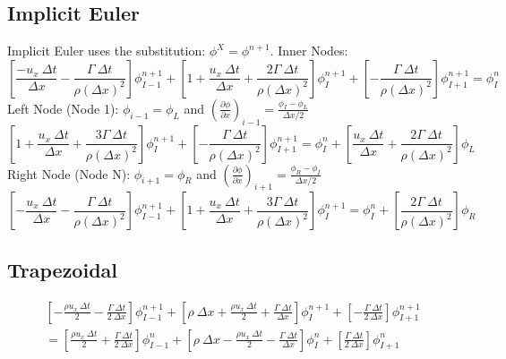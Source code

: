 \documentclass[12pt]{article}
\begin{document}
\subsection{Implicit Euler}
Implicit Euler uses the substitution: $\phi^{X} = \phi^{n+1}$.
Inner Nodes:
\begin{equation}
    \left[ \frac{-u_x\: \Delta t}{\Delta x} - \frac{\Gamma\:\Delta t}{\rho\left(\Delta x\right)^2} \right]\phi_{I-1}^{n+1} + \left[ 1 + \frac{u_x\: \Delta t}{\Delta x} + \frac{2\Gamma\: \Delta t}{\rho\left(\Delta x\right)^2} \right]\phi_{I}^{n+1} + \left[ -\frac{\Gamma\: \Delta t}{\rho\left(\Delta x\right)^2} \right]\phi_{I+1}^{n+1} = \phi_{I}^{n}
    \label{eq:ie inner}
\end{equation}
Left Node (Node 1): $\phi_{i-1} = \phi_L$ and $\left( \frac{\partial \phi}{\partial x} \right)_{i-1} = \frac{\phi_I - \phi_L}{\Delta x/2}$
\begin{equation}
    \left[ 1 + \frac{u_x\:\Delta t}{\Delta x} + \frac{3\Gamma\:\Delta t}{\rho\left(\Delta x\right)^2} \right]\phi_{I}^{n+1} + \left[ -\frac{\Gamma\:\Delta t}{\rho\left(\Delta x\right)^2} \right]\phi_{I+1}^{n+1} = \phi_{I}^{n} + \left[ \frac{u_x\:\Delta t}{\Delta x} + \frac{2\Gamma\:\Delta t}{\rho\left(\Delta x\right)^2} \right]\phi_{L}
    \label{eq:ie left}
\end{equation}
Right Node (Node N): $\phi_{i+1} = \phi_R$ and $\left( \frac{\partial \phi}{\partial x} \right)_{i+1} = \frac{\phi_R - \phi_I}{\Delta x/2}$
\begin{equation}
    \left[ -\frac{u_x\:\Delta t}{\Delta x} - \frac{\Gamma\:\Delta t}{\rho\left(\Delta x\right)^2} \right]\phi_{I-1}^{n+1} + \left[ 1 + \frac{u_x\:\Delta t}{\Delta x} + \frac{3\Gamma\:\Delta t}{\rho\left(\Delta x\right)^2} \right]\phi_{I}^{n+1} = \phi_{I}^{n} + \left[ \frac{2\Gamma\:\Delta t}{\rho\left(\Delta x\right)^2} \right]\phi_{R}
    \label{eq:ie right}
\end{equation}


\subsection{Trapezoidal}
\begin{multline*}
    \left[ -\frac{\rho u_x\: \Delta t}{2} - \frac{\Gamma\: \Delta t}{2\: \Delta x} \right]\phi_{I-1}^{n+1} + \left[ \rho \:\Delta x + \frac{\rho u_x\: \Delta t}{2} + \frac{\Gamma\: \Delta t}{\Delta x} \right]\phi_{I}^{n+1} + \left[ -\frac{\Gamma\: \Delta t}{2\: \Delta x} \right]\phi_{I+1}^{n+1}\\
    = \left[ \frac{\rho u_x\: \Delta t}{2} + \frac{\Gamma\: \Delta t}{2\: \Delta x} \right]\phi_{I-1}^{n} + \left[ \rho \:\Delta x - \frac{\rho u_x\: \Delta t}{2} - \frac{\Gamma\: \Delta t}{\Delta x} \right]\phi_{I}^{n} + \left[ \frac{\Gamma\: \Delta t}{2\: \Delta x} \right]\phi_{I+1}^{n}
\end{multline*}
\end{document}
